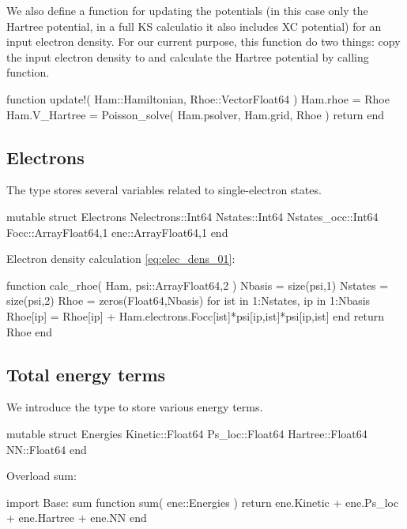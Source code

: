 We also define a function for updating the potentials (in this case only the Hartree potential, in
a full KS calculatio it also includes XC potential)
for an input electron density.
For our current purpose, this function do two things:
copy the input electron density to  and calculate the
Hartree potential by calling  function.

\begin{juliacode}
function update!( Ham::Hamiltonian, Rhoe::Vector{Float64} )
    Ham.rhoe = Rhoe
    Ham.V_Hartree = Poisson_solve( Ham.psolver, Ham.grid, Rhoe )
    return
end
\end{juliacode}


\subsection{Electrons}

The type  stores several variables related to single-electron states.
\begin{juliacode}
mutable struct Electrons
    Nelectrons::Int64
    Nstates::Int64
    Nstates_occ::Int64
    Focc::Array{Float64,1}
    ene::Array{Float64,1}
end
\end{juliacode}

Electron density calculation \ref{eq:elec_dens_01}:
\begin{juliacode}
function calc_rhoe( Ham, psi::Array{Float64,2} )
    Nbasis = size(psi,1)
    Nstates = size(psi,2)
    Rhoe = zeros(Float64,Nbasis)
    for ist in 1:Nstates, ip in 1:Nbasis
        Rhoe[ip] = Rhoe[ip] +
          Ham.electrons.Focc[ist]*psi[ip,ist]*psi[ip,ist]
    end
    return Rhoe
end
\end{juliacode}


\subsection{Total energy terms}

We introduce the  type to store various energy terms.
\begin{juliacode}
mutable struct Energies
    Kinetic::Float64
    Ps_loc::Float64
    Hartree::Float64
    NN::Float64
end
\end{juliacode}

Overload sum:
\begin{juliacode}
import Base: sum
function sum( ene::Energies )
    return ene.Kinetic + ene.Ps_loc + ene.Hartree + ene.NN
end
\end{juliacode}

